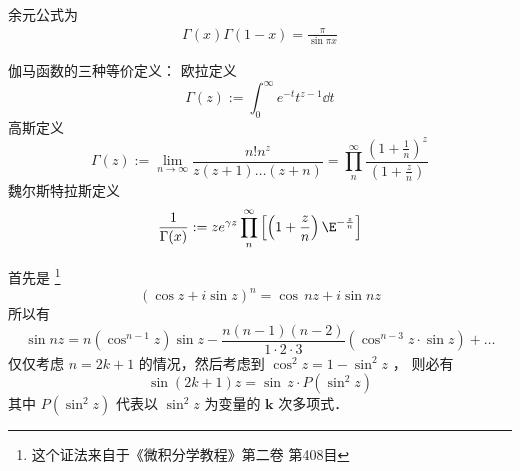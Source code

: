 
\begin{issues}
\issueMissDepend
\end{issues}

余元公式为
\begin{align}
\Gamma(x)\Gamma(1-x)=\frac{\pi}{\sin  \pi x}
\end{align}

\begin{lemma}{伽马函数的三种等价定义：}
欧拉定义
\begin{equation}
\Gamma(z):=\int^{\infty}_{0}e^{-t}t^{z-1} \dd{t}
\end{equation}
高斯定义
\begin{equation}
\Gamma(z):=\lim_{n \rightarrow \infty}{\frac{n!n^z}{z(z+1)\dots (z+n)}}=\prod_{n}^{\infty}\frac{\left( 1+\frac1n \right)^z}{\left( 1+\frac zn \right)}
\end{equation}
魏尔斯特拉斯定义
\begin{equation}
\frac1{\Gamma(x)}:=ze^{\gamma z}\prod_{n}^{\infty}\left[ \left( 1+\frac{z}{n}\right)\E^{-\frac{z}{n}}  \right]
\end{equation}
\end{lemma}
首先是 \footnote{这个证法来自于《微积分学教程》第二卷 第408目}
\begin{equation}
(\cos z+i\sin z)^n=\cos\,nz+i\sin nz
\end{equation}
所以有
\begin{equation}
\sin nz=n(\cos^{n-1}z)\sin z-\frac{n(n-1)(n-2)}{1\cdot 2\cdot 3}(\cos^{n-3}z \cdot \sin z)+\dots
\end{equation}
仅仅考虑 $n=2k+1$ 的情况，然后考虑到 $\cos^2 z=1-\sin^2z$ ， 则必有
\begin{equation}
\sin(2k+1)z=\sin\,z\cdot P(\sin^2z)
\end{equation}
其中 $P(\sin^2z)$ 代表以 $ \sin^2z$ 为变量的 $\mathbf{k}$ 次多项式．

